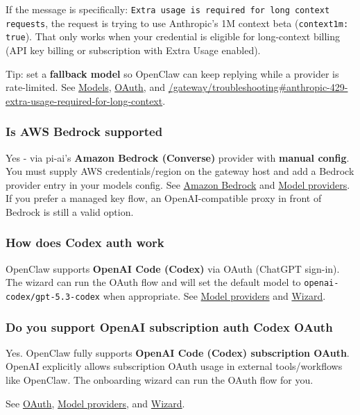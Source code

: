If the message is specifically:
\texttt{Extra usage is required for long context requests}, the request is trying to use
Anthropic's 1M context beta (\texttt{context1m: true}). That only works when your
credential is eligible for long-context billing (API key billing or subscription
with Extra Usage enabled).

Tip: set a \textbf{fallback model} so OpenClaw can keep replying while a provider is rate-limited.
See \href{/cli/models}{Models}, \href{/concepts/oauth}{OAuth}, and
\href{/gateway/troubleshooting\#anthropic-429-extra-usage-required-for-long-context}{/gateway/troubleshooting\#anthropic-429-extra-usage-required-for-long-context}.

\subsubsection{Is AWS Bedrock supported}


Yes - via pi-ai's \textbf{Amazon Bedrock (Converse)} provider with \textbf{manual config}. You must supply AWS credentials/region on the gateway host and add a Bedrock provider entry in your models config. See \href{/providers/bedrock}{Amazon Bedrock} and \href{/providers/models}{Model providers}. If you prefer a managed key flow, an OpenAI-compatible proxy in front of Bedrock is still a valid option.

\subsubsection{How does Codex auth work}


OpenClaw supports \textbf{OpenAI Code (Codex)} via OAuth (ChatGPT sign-in). The wizard can run the OAuth flow and will set the default model to \texttt{openai-codex/gpt-5.3-codex} when appropriate. See \href{/concepts/model-providers}{Model providers} and \href{/start/wizard}{Wizard}.

\subsubsection{Do you support OpenAI subscription auth Codex OAuth}


Yes. OpenClaw fully supports \textbf{OpenAI Code (Codex) subscription OAuth}.
OpenAI explicitly allows subscription OAuth usage in external tools/workflows
like OpenClaw. The onboarding wizard can run the OAuth flow for you.

See \href{/concepts/oauth}{OAuth}, \href{/concepts/model-providers}{Model providers}, and \href{/start/wizard}{Wizard}.

